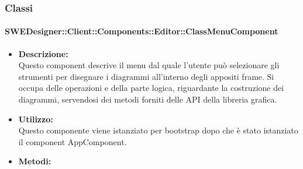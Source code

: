 		\subsubsection{Classi}
			\paragraph{SWEDesigner::Client::Components::Editor::ClassMenuComponent}
				\begin{itemize}
          			\item \textbf{Descrizione:}\\
          			Questo component descrive il menu dal quale l’utente può selezionare gli strumenti per disegnare i diagrammi all’interno degli appositi frame. Si occupa delle operazioni e della parte logica, riguardante la costruzione dei diagrammi, servendosi dei metodi forniti delle API della libreria grafica.
          			\item \textbf{Utilizzo:}\\
          			Questo componente viene istanziato per bootstrap dopo che è stato istanziato il component AppComponent.
          			\item \textbf{Metodi:}\\
          		\end{itemize}
